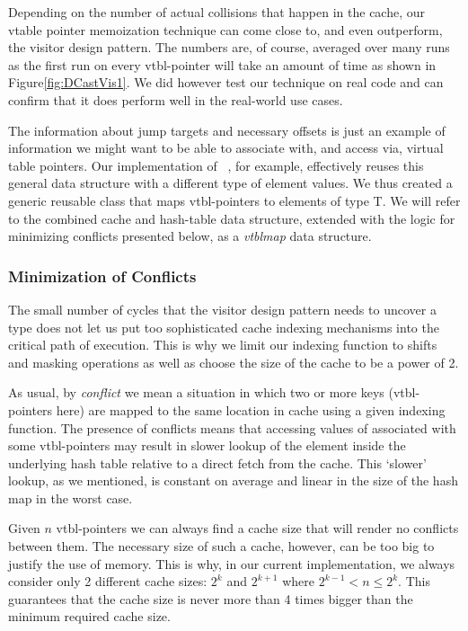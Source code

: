 Depending on the number of actual collisions that happen in the cache, our 
vtable pointer memoization technique can come close to, and even outperform, the 
visitor design pattern. The numbers are, of course, averaged over many runs as 
the first run on every vtbl-pointer will take an amount of time as shown in 
Figure\ref{fig:DCastVis1}. We did however test our technique on real code and 
can confirm that it does perform well in the real-world use cases.

The information about jump targets and necessary offsets is just an example of 
information we might want to be able to associate with, and access via, virtual 
table pointers. Our implementation of ~\cite[]{TR}, for example, 
effectively reuses this general data structure with a different type of element 
values. We thus created a generic reusable class  that maps 
vtbl-pointers to elements of type T. We will refer to the combined cache and 
hash-table data structure, extended with the logic for minimizing conflicts 
presented below, as a \emph{vtblmap} data structure.

\subsubsection{Minimization of Conflicts}
\label{sec:moc}

The small number of cycles that the visitor design pattern needs to uncover a 
type does not let us put too sophisticated cache indexing mechanisms into the 
critical path of execution. This is why we limit our indexing function to shifts 
and masking operations as well as choose the size of the cache to be a power of 2.

As usual, by \emph{conflict} we mean a situation in which two or more keys 
(vtbl-pointers here) are mapped to the same location in cache using a given 
indexing function. The presence of conflicts means that accessing values of  
associated with some vtbl-pointers may result in slower lookup of the element 
inside the underlying hash table relative to a direct fetch from the cache.
This `slower' lookup, as we mentioned, is constant on average and linear in the 
size of the hash map in the worst case.

Given $n$ vtbl-pointers we can always find a cache size that will render no 
conflicts between them. The necessary size of such a cache, however, can be too 
big to justify the use of memory. This is why, in our current implementation, we 
always consider only 2 different cache sizes: $2^k$ and $2^{k+1}$ where 
$2^{k-1} < n \leq 2^k$. This guarantees that the cache size is never more than 4 
times bigger than the minimum required cache size.

